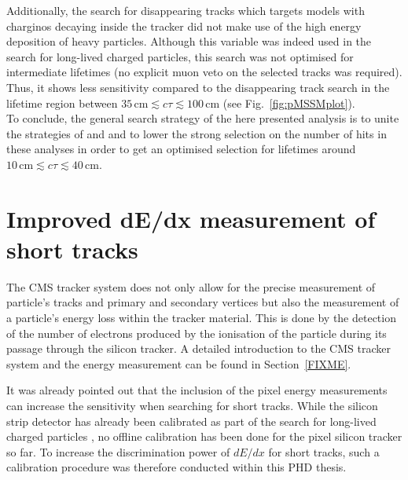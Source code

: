 Additionally, the search for disappearing tracks which targets models with charginos decaying inside the tracker did not make use of the high energy deposition of heavy particles. 
Although this variable was indeed used in the search for long-lived charged particles, this search was not optimised for intermediate lifetimes (\eg no explicit muon veto on the selected tracks was required). 
Thus, it shows less sensitivity compared to the disappearing track search in the lifetime region between $35\,\text{cm} \lesssim c\tau \lesssim 100\,\text{cm}$ (see Fig.~\ref{fig:pMSSMplot}).\\

To conclude, the general search strategy of the here presented analysis is to unite the strategies of \cite{bib:CMS:HSCP_8TeV} and \cite{bib:CMS:DT_8TeV} and to lower the strong selection on the number of hits in these analyses in order to get an optimised selection for lifetimes around $10\,\text{cm} \lesssim c\tau \lesssim  40\,\text{cm}$.

\chapter{Improved dE/dx measurement of short tracks}
\label{sec:DeDxMeasurement}
The CMS tracker system does not only allow for the precise measurement of particle's tracks and primary and secondary vertices but also the measurement of a particle's energy loss within the tracker material.
This is done by the detection of the number of electrons produced by the ionisation of the particle during its passage through the silicon tracker.
A detailed introduction to the CMS tracker system and the energy measurement can be found in Section~\ref{FIXME}.

It was already pointed out that the inclusion of the pixel energy measurements can increase the sensitivity when searching for short tracks.
While the silicon strip detector has already been calibrated as part of the search for long-lived charged particles \cite{bib:CMS:HSCP_8TeV}, no offline calibration has been done for the pixel silicon tracker so far.
To increase the discrimination power of $dE/dx$ for short tracks, such a calibration procedure was therefore conducted within this PHD thesis.



